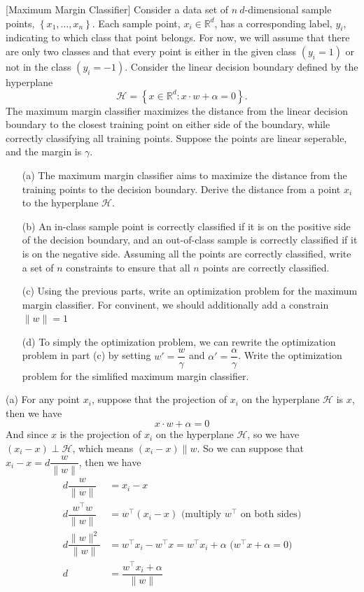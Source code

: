 \item {} [Maximum Margin Classifier]
Consider a data set of $n\ d$-dimensional sample points, $\left\{x_1, \ldots, x_n\right\}$. Each sample point, $x_i \in \mathbb{R}^d$, has a corresponding label, $y_i$, indicating to which class that point belongs. For now, we will assume that there are only two classes and that every point is either in the given class $\left(y_i=1\right)$ or not in the class $\left(y_i=-1\right)$. Consider the linear decision boundary defined by the hyperplane
$$
\mathcal{H}=\left\{x \in \mathbb{R}^d: x \cdot w+\alpha=0\right\} .
$$
The maximum margin classifier maximizes the distance from the linear decision boundary to the closest training point on either side of the boundary, while correctly classifying all training points. Suppose the points are linear seperable, and the margin is $\gamma$.

\begin{itemize}
\item[(a)]The maximum margin classifier aims to maximize the distance from the training points to the decision boundary. Derive the distance from a point $x_i$ to the hyperplane $\mathcal{H}$. ~

\item[(b)] An in-class sample point is correctly classified if it is on the positive side of the decision boundary, and an out-of-class sample is correctly classified if it is on the negative side. Assuming all the points are correctly classified, write a set of $n$ constraints to ensure that all $n$ points are correctly classified. ~

\item[(c)] Using the previous parts, write an optimization problem for the maximum margin classifier. For convinent, we should additionally add a constrain $\|w\|=1$ ~

\item[(d)] To simply the optimization problem, we can rewrite the optimization problem in part (c) by setting $w'=\dfrac{w}{\gamma}$ and $\alpha'=\dfrac{\alpha}{\gamma}$. Write the optimization problem for the simlified maximum margin classifier. ~

\end{itemize}

\solution

(a) For any point $x_i$, suppose that the projection of $x_i$ on the hyperplane $\mathcal{H}$ is $x$, then we have
$$x\cdot w+\alpha=0$$
And since $x$ is the projection of $x_i$ on the hyperplane $\mathcal{H}$, so we have $(x_i-x)\perp \mathcal{H}$, which means
$(x_i-x) \parallel w$. So we can suppose that $x_i-x=d \dfrac{w}{\|w\|}$, then we have
\begin{align*}
d \dfrac{w}{\|w\|}&=x_i - x \\
d \dfrac{w^{\top}w}{\|w\|}&=w^{\top}(x_i - x)  \text{ (multiply $w^{\top}$ on both sides)} \\
d \dfrac{\|w\|^2}{\|w\|}&=w^{\top}x_i - w^{\top}x = w^{\top}x_i + \alpha \text{ ($w^{\top}x+\alpha=0$)} \\
d &= \dfrac{w^{\top}x_i + \alpha}{\|w\|}
\end{align*}

